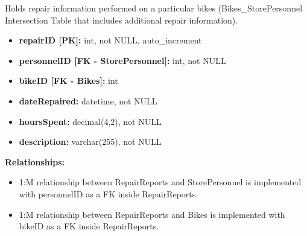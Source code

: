 \documentclass{article}
\begin{document}
\vspace{0.5cm}

\begin{tcolorbox}[colback=secondarycolor, colframe=primarycolor, title=\textbf{RepairReports Table}]
Holds repair information performed on a particular bikes (Bikes\_StorePersonnel Intersection Table that includes additional repair information).
\vspace{0.2cm}

\begin{itemize}
  \item \textbf{repairID [PK]:} int, not NULL, auto\_increment
  \item \textbf{personnelID [FK - StorePersonnel]:} int, not NULL
  \item \textbf{bikeID [FK - Bikes]:} int
  \item \textbf{dateRepaired:} datetime, not NULL
  \item \textbf{hoursSpent:} decimal(4,2), not NULL
  \item \textbf{description:} varchar(255), not NULL
\end{itemize}
\vspace{0.2cm}

\textbf{Relationships:}
\vspace{0.2cm}
\begin{itemize}
  \item 1:M relationship between RepairReports and StorePersonnel is implemented with personnelID as a FK inside RepairReports.
  \item 1:M relationship between RepairReports and Bikes is implemented with bikeID as a FK inside RepairReports.
\end{itemize}
\end{tcolorbox}

\vspace{0.5cm}
\end{document}
